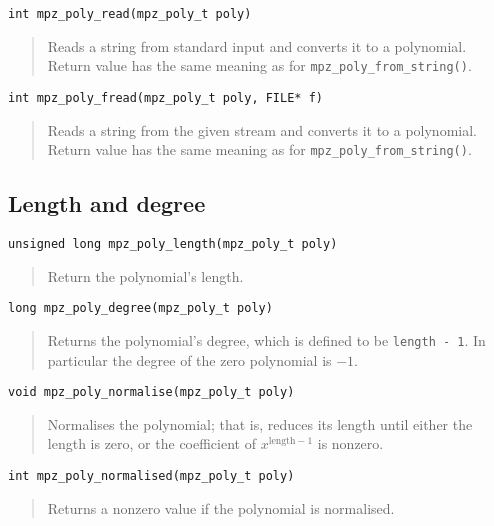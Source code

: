 \documentclass[a4paper,10pt]{article}
\newcommand{\code}{\lstinline}
\begin{document}
\begin{lstlisting}
int mpz_poly_read(mpz_poly_t poly)
\end{lstlisting}
\begin{quote}
Reads a string from standard input and converts it to a polynomial. Return value has the same meaning as for \code{mpz_poly_from_string()}.
\end{quote}

\begin{lstlisting}
int mpz_poly_fread(mpz_poly_t poly, FILE* f)
\end{lstlisting}
\begin{quote}
Reads a string from the given stream and converts it to a polynomial. Return value has the same meaning as for \code{mpz_poly_from_string()}.
\end{quote}


\subsection{Length and degree}

\begin{lstlisting}
unsigned long mpz_poly_length(mpz_poly_t poly)
\end{lstlisting}
\begin{quote}
Return the polynomial's length.
\end{quote}

\begin{lstlisting}
long mpz_poly_degree(mpz_poly_t poly)
\end{lstlisting}
\begin{quote}
Returns the polynomial's degree, which is defined to be \code{length - 1}. In particular the degree of the zero polynomial is $-1$.
\end{quote}

\begin{lstlisting}
void mpz_poly_normalise(mpz_poly_t poly)
\end{lstlisting}
\begin{quote}
Normalises the polynomial; that is, reduces its length until either the length is zero, or the coefficient of $x^{\text{length} - 1}$ is nonzero.
\end{quote}

\begin{lstlisting}
int mpz_poly_normalised(mpz_poly_t poly)
\end{lstlisting}
\begin{quote}
Returns a nonzero value if the polynomial is normalised.
\end{quote}
\end{document}
